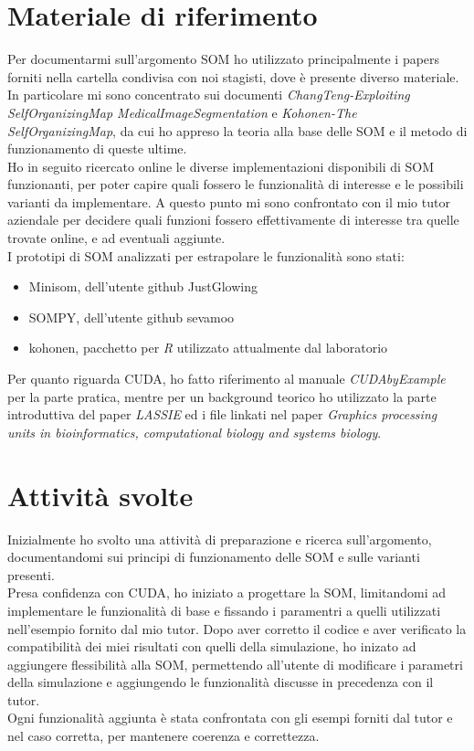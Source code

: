 \section{Materiale di riferimento}
Per documentarmi sull'argomento SOM ho utilizzato principalmente i papers forniti nella cartella condivisa con noi stagisti, dove è presente diverso materiale. In particolare mi sono concentrato sui documenti  \textit{ChangTeng-Exploiting SelfOrganizingMap MedicalImageSegmentation} e  \textit{Kohonen-The SelfOrganizingMap}, da cui ho appreso la teoria alla base delle SOM e il metodo di funzionamento di queste ultime.\\
Ho in seguito ricercato online le diverse implementazioni disponibili di SOM funzionanti, per poter capire quali fossero le funzionalità di interesse e le possibili varianti da implementare.
A questo punto mi sono confrontato con il mio tutor aziendale per decidere quali funzioni fossero effettivamente di interesse tra quelle trovate online, e ad eventuali aggiunte. \\
I prototipi di SOM analizzati per estrapolare le funzionalità sono stati:
\begin{itemize}
	\item Minisom, dell'utente github JustGlowing
	\item SOMPY, dell'utente github sevamoo
	\item kohonen, pacchetto per \textit{R} utilizzato attualmente dal laboratorio
\end{itemize}
Per quanto riguarda CUDA, ho fatto riferimento al manuale \textit{CUDAbyExample} per la parte pratica, mentre per un background teorico ho utilizzato la parte introduttiva del paper \textit{LASSIE} ed i file linkati nel paper \textit{Graphics processing units in bioinformatics, computational biology and systems biology}.

\section{Attività svolte}
Inizialmente ho svolto una attività di preparazione e ricerca sull'argomento, documentandomi sui principi di funzionamento delle SOM e sulle varianti presenti.\\
Presa confidenza con CUDA, ho iniziato a progettare la SOM, limitandomi ad implementare le funzionalità di base e fissando i paramentri a quelli utilizzati nell'esempio fornito dal mio tutor. Dopo aver corretto il codice e aver verificato la compatibilità dei miei risultati con quelli della simulazione, ho inizato ad aggiungere flessibilità alla SOM, permettendo all'utente di modificare i parametri della simulazione e aggiungendo le funzionalità discusse in precedenza con il tutor.\\
Ogni funzionalità aggiunta è stata confrontata con gli esempi forniti dal tutor e nel caso corretta, per mantenere coerenza e correttezza.


